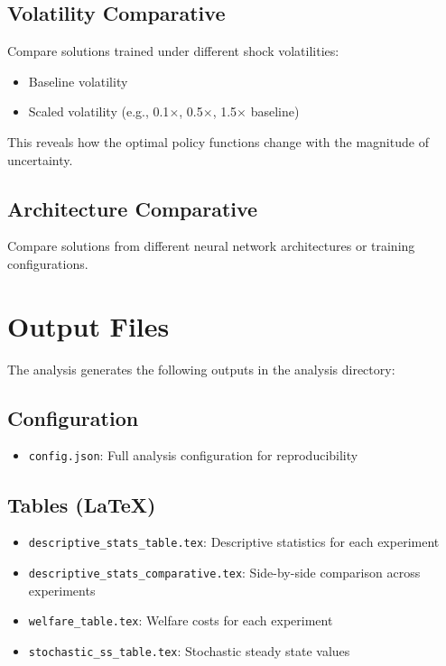 \documentclass[11pt]{article}
\begin{document}
\subsection{Volatility Comparative}
Compare solutions trained under different shock volatilities:
\begin{itemize}
    \item Baseline volatility
    \item Scaled volatility (e.g., 0.1$\times$, 0.5$\times$, 1.5$\times$ baseline)
\end{itemize}

This reveals how the optimal policy functions change with the magnitude of uncertainty.

\subsection{Architecture Comparative}
Compare solutions from different neural network architectures or training configurations.

\section{Output Files}

The analysis generates the following outputs in the analysis directory:

\subsection{Configuration}
\begin{itemize}
    \item \texttt{config.json}: Full analysis configuration for reproducibility
\end{itemize}

\subsection{Tables (LaTeX)}
\begin{itemize}
    \item \texttt{descriptive\_stats\_table.tex}: Descriptive statistics for each experiment
    \item \texttt{descriptive\_stats\_comparative.tex}: Side-by-side comparison across experiments
    \item \texttt{welfare\_table.tex}: Welfare costs for each experiment
    \item \texttt{stochastic\_ss\_table.tex}: Stochastic steady state values
\end{itemize}
\end{document}
